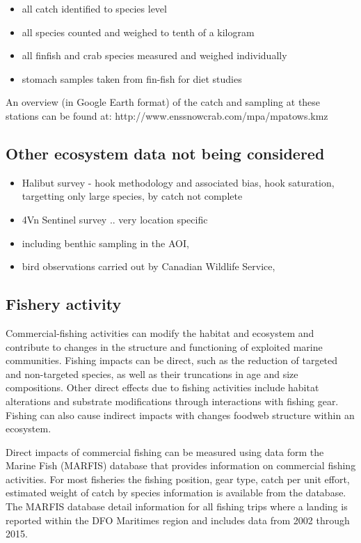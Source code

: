 \documentclass[letterpaper,portrait,11pt]{scrartcl}
\numberwithin{equation}{section}		%
\numberwithin{figure}{section}			%
\numberwithin{table}{section}				%
\begin{document}
\begin{itemize*}
\begin{itemize}
  \item all catch identified to species level
  \item all species counted and weighed to tenth of a kilogram
  \item all finfish and crab species measured and weighed individually
  \item stomach samples taken from fin-fish for diet studies
\end{itemize}

An overview (in Google Earth format) of the catch and sampling at these stations can be found at: http://www.enssnowcrab.com/mpa/mpatows.kmz

\subsection{Other ecosystem data not being considered}
\begin{itemize}
   \item Halibut survey - hook methodology and associated bias, hook saturation, targetting only large species, by catch not complete 
   \item 4Vn Sentinel survey .. very location specific
   \item including benthic sampling in the AOI, 
   \item bird observations carried out by Canadian Wildlife Service, 
\end{itemize}	
  

\subsection{Fishery activity}
Commercial-fishing activities can modify the habitat and ecosystem and contribute to changes in the structure and functioning of exploited marine communities.  Fishing impacts can be direct, such as the reduction of targeted and non-targeted species, as well as their truncations in age and size compositions.  Other direct effects due to fishing activities include habitat alterations and substrate modifications through interactions with fishing gear.  Fishing can also cause indirect impacts with changes foodweb structure within an ecosystem.  

Direct impacts of commercial fishing can be measured using data form the Marine Fish (MARFIS) database that provides information on commercial fishing activities.  For most fisheries the fishing position, gear type, catch per unit effort, estimated weight of catch by species information is available from the database. The MARFIS database detail information for all fishing trips where a landing is reported within the DFO Maritimes region and includes data from 2002 through 2015.  


\end{itemize*}
\end{document}
